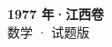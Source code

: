 \documentclass[zihao=-4, a4paper]{ctexart}
\begin{document}
\begin{center}
  {\Large\bfseries 1977 年·江西卷}\\[4pt]
  {\large 数学 · 试题版}
\end{center}
\medskip
{}

\end{document}
